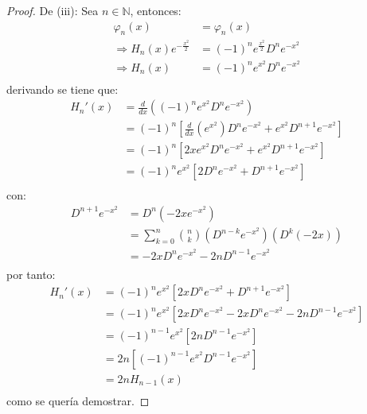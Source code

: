 \documentclass[12pt]{report}
\theoremstyle{largebreak}
\begin{document}
\begin{proof}
        De (iii): Sea $n\in\mathbb{N}$, entonces:
        \begin{equation*}
            \begin{split}
                \varphi_n(x)&=\varphi_n(x)\\
                \Rightarrow H_n(x)e^{-\frac{x^2}{2}}&=(-1)^{n}e^{\frac{x^2}{2}}D^ne^{-x^2}\\
                \Rightarrow H_n(x)&=(-1)^{n}e^{x^2} D^ne^{-x^2}\\
            \end{split}
        \end{equation*}
        derivando se tiene que:
        \begin{equation*}
            \begin{split}
                H_n'(x)&=\frac{d}{dx}\left((-1)^{n}e^{x^2} D^ne^{-x^2}\right) \\
                &=(-1)^{n}\left[\frac{d}{dx}\left(e^{x^2}\right)D^ne^{-x^2}+e^{x^2}D^{n+1} e^{-x^2}\right] \\
                &=(-1)^{n}\left[2xe^{x^2}D^ne^{-x^2}+e^{x^2}D^{n+1} e^{-x^2}\right] \\
                &=(-1)^{n}e^{x^2}\left[2D^ne^{-x^2}+D^{n+1} e^{-x^2}\right] \\
            \end{split}
        \end{equation*}
        con:
        \begin{equation*}
            \begin{split}
                D^{n+1} e^{-x^2}&=D^n(-2xe^{-x^2})\\
                &=\sum_{ k=0}^n \binom{n}{k}(D^{ n-k}e^{-x^2})(D^k(-2x)) \\
                &=-2x D^ne^{-x^2}-2nD^{ n-1}e^{-x^2}\\
            \end{split}
        \end{equation*}
        por tanto:
        \begin{equation*}
            \begin{split}
                H_n'(x)&=(-1)^{n}e^{x^2}\left[2xD^ne^{-x^2}+D^{n+1} e^{-x^2}\right] \\
                &=(-1)^{n}e^{x^2}\left[2xD^ne^{-x^2}-2x D^ne^{-x^2}-2nD^{ n-1}e^{-x^2}\right] \\
                &=(-1)^{n-1}e^{x^2}\left[2nD^{ n-1}e^{-x^2}\right] \\
                &=2n\left[(-1)^{n-1}e^{x^2}D^{ n-1}e^{-x^2}\right] \\
                &=2nH_{n-1}(x)\\
            \end{split}
        \end{equation*}
        como se quería demostrar.


\end{proof}
\end{document}
